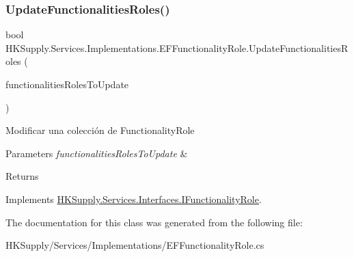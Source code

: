 \subsubsection{\texorpdfstring{Update\+Functionalities\+Roles()}{UpdateFunctionalitiesRoles()}}
{\footnotesize\ttfamily bool H\+K\+Supply.\+Services.\+Implementations.\+E\+F\+Functionality\+Role.\+Update\+Functionalities\+Roles (\begin{DoxyParamCaption}\item[{I\+Enumerable$<$ \hyperlink{class_h_k_supply_1_1_models_1_1_functionality_role}{Functionality\+Role} $>$}]{functionalities\+Roles\+To\+Update }\end{DoxyParamCaption})}



Modificar una colección de Functionality\+Role 


\begin{DoxyParams}{Parameters}
{\em functionalities\+Roles\+To\+Update} & \\
\hline
\end{DoxyParams}
\begin{DoxyReturn}{Returns}

\end{DoxyReturn}


Implements \hyperlink{interface_h_k_supply_1_1_services_1_1_interfaces_1_1_i_functionality_role}{H\+K\+Supply.\+Services.\+Interfaces.\+I\+Functionality\+Role}.



The documentation for this class was generated from the following file\+:\begin{DoxyCompactItemize}
\item 
H\+K\+Supply/\+Services/\+Implementations/E\+F\+Functionality\+Role.\+cs\end{DoxyCompactItemize}
